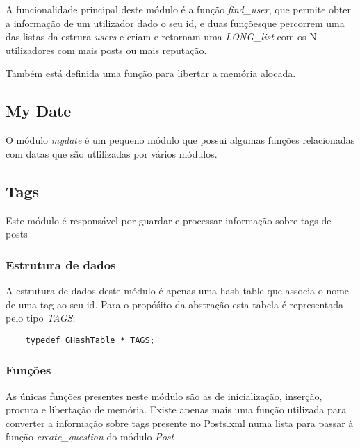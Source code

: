 \documentclass[10pt]{article}
\begin{document}
	A funcionalidade principal deste módulo é a função \emph{find\_user}, que permite obter a informação de um utilizador dado o seu id, e duas funçõesque percorrem uma das listas da estrura \emph{users} e criam e retornam uma \emph{LONG\_list} com os N utilizadores com mais posts ou mais reputação.

	Também está definida uma função para libertar a memória alocada.

\subsection{My Date}

	O módulo \emph{mydate} é um pequeno módulo que possui algumas funções relacionadas com datas que são utlilizadas por vários módulos. 

\subsection{Tags}
	Este módulo é responsável por guardar e processar informação sobre tags de posts
\subsubsection{Estrutura de dados}
	A estrutura de dados deste módulo é apenas uma hash table que associa o nome de uma tag ao seu id. Para o propóśito da abstração esta tabela é representada pelo tipo \emph{TAGS}:
	\begin{lstlisting} 
	typedef GHashTable * TAGS;
	\end{lstlisting}

\subsubsection{Funções}
	As únicas funções presentes neste módulo são as de inicialização, inserção, procura e libertação de memória. Existe apenas mais uma função utilizada para converter a informação sobre tags presente no Posts.xml numa lista para passar à função \emph{create\_question} do módulo \emph{Post}
\end{document}
